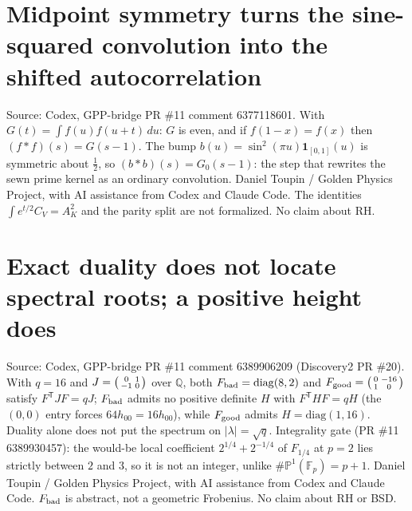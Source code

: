\documentclass{report}
\theoremstyle{definition}
\begin{document}
\begin{itemize}
\begin{itemize}
\section{Midpoint symmetry turns the sine-squared convolution into the shifted autocorrelation}
Source: Codex, GPP-bridge PR \#11 comment 6377118601. With $G(t)=\int f(u)f(u+t)\,du$: $G$ is even, and if $f(1-x)=f(x)$ then $(f*f)(s)=G(s-1)$. The bump
$b(u)=\sin^2(\pi u)\mathbf 1_{[0,1]}(u)$ is symmetric about $\tfrac12$, so $(b*b)(s)=G_0(s-1)$: the step that rewrites the sewn prime kernel as an ordinary convolution.
Daniel Toupin / Golden Physics Project, with AI assistance from Codex and Claude Code. The identities $\int e^{t/2}C_V=A_K^2$ and the parity split are not formalized.
No claim about RH.

\section{Exact duality does not locate spectral roots; a positive height does}
Source: Codex, GPP-bridge PR \#11 comment 6389906209 (Discovery2 PR \#20). With $q=16$ and $J=\begin{psmallmatrix}0&1\\-1&0\end{psmallmatrix}$ over $\mathbb Q$, both
$F_{\rm bad}=\mathrm{diag}(8,2)$ and $F_{\rm good}=\begin{psmallmatrix}0&-16\\1&0\end{psmallmatrix}$ satisfy $F^{\mathsf T}JF=qJ$; $F_{\rm bad}$ admits no positive definite $H$ with
$F^{\mathsf T}HF=qH$ (the $(0,0)$ entry forces $64h_{00}=16h_{00}$), while $F_{\rm good}$ admits $H=\mathrm{diag}(1,16)$. Duality alone does not put the spectrum on $|\lambda|=\sqrt q$. Integrality gate (PR \#11 6389930457): the would-be local coefficient $2^{1/4}+2^{-1/4}$ of $F_{1/4}$ at $p=2$ lies strictly between $2$ and $3$, so it is not an integer, unlike $\#\mathbb P^1(\mathbb F_p)=p+1$.
Daniel Toupin / Golden Physics Project, with AI assistance from Codex and Claude Code. $F_{\rm bad}$ is abstract, not a geometric Frobenius. No claim about RH or BSD.


\end{itemize}
\end{itemize}
\end{document}
